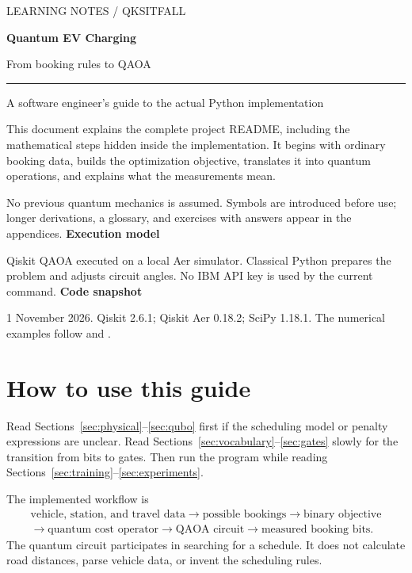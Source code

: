 \hypersetup{pageanchor=false}
\begin{titlepage}
\color{ink}
\vspace*{12mm}
{\large\sffamily LEARNING NOTES \quad / \quad QKSITFALL}\par
\vspace{16mm}
{\Huge\bfseries Quantum EV Charging}\par
\vspace{4mm}
{\LARGE From booking rules to QAOA}\par
\vspace{10mm}
\rule{\textwidth}{0.8pt}
\vspace{5mm}
{\large A software engineer's guide to the actual Python implementation}\par
\vspace{10mm}
This document explains the complete project README, including the mathematical
steps hidden inside the implementation. It begins with ordinary booking data,
builds the optimization objective, translates it into quantum operations, and
explains what the measurements mean.

No previous quantum mechanics is assumed. Symbols are introduced before use;
longer derivations, a glossary, and exercises with answers appear in the appendices.
\vfill
\textbf{Execution model}\par
Qiskit QAOA executed on a local Aer simulator. Classical Python prepares the
problem and adjusts circuit angles. No IBM API key is used by the current command.
\vspace{8mm}
\textbf{Code snapshot}\par
1 November 2026. Qiskit 2.6.1; Qiskit Aer 0.18.2; SciPy 1.18.1.
The numerical examples follow  and .
\end{titlepage}
\hypersetup{pageanchor=true}

\tableofcontents
\clearpage
{}

\section{How to use this guide}
Read Sections~\ref{sec:physical}--\ref{sec:qubo} first if the scheduling model or
penalty expressions are unclear. Read Sections~\ref{sec:vocabulary}--\ref{sec:gates}
slowly for the transition from bits to gates. Then run the program while reading
Sections~\ref{sec:training}--\ref{sec:experiments}.

The implemented workflow is
\begin{equation*}
\begin{gathered}
\text{vehicle, station, and travel data}
\longrightarrow \text{possible bookings}
\longrightarrow \text{binary objective}\\
\longrightarrow \text{quantum cost operator}
\longrightarrow \text{QAOA circuit}
\longrightarrow \text{measured booking bits}.
\end{gathered}
\end{equation*}
The quantum circuit participates in searching for a schedule. It does not
calculate road distances, parse vehicle data, or invent the scheduling rules.

